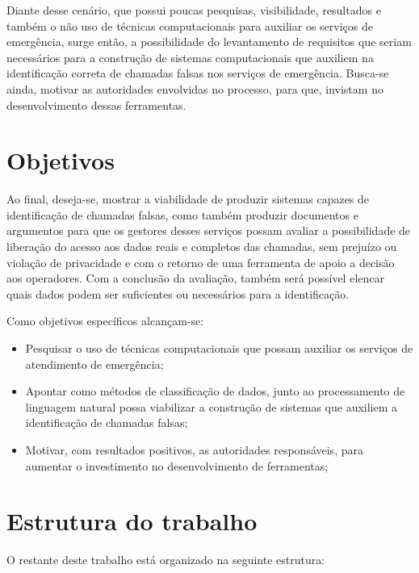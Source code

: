 Diante desse cenário, que possui poucas pesquisas, visibilidade, resultados e também o não uso de técnicas computacionais para auxiliar os serviços de emergência, surge então, a possibilidade do levantamento de requisitos que seriam necessários para a construção de sistemas computacionais que auxiliem na identificação correta de chamadas falsas nos serviços de emergência. Busca-se ainda, motivar as autoridades envolvidas no processo, para que, invistam no desenvolvimento dessas ferramentas.

\section{Objetivos}
Ao final, deseja-se, mostrar a viabilidade de produzir sistemas capazes de identificação de chamadas falsas, como também produzir documentos e argumentos para que os gestores desses serviços possam avaliar a possibilidade de liberação do acesso aos dados reais e completos das chamadas, sem prejuízo ou violação de privacidade e com o retorno de uma ferramenta de apoio a decisão aos operadores. Com a conclusão da avaliação, também será possível elencar quais dados podem ser suficientes ou necessários para a identificação.

Como objetivos específicos alcançam-se:

\begin{itemize}
    \item Pesquisar o uso de técnicas computacionais que possam auxiliar os serviços de atendimento de emergência;
    \item Apontar como métodos de classificação de dados, junto ao processamento de linguagem natural possa viabilizar a construção de sistemas que auxiliem a identificação de chamadas falsas;
    \item Motivar, com resultados positivos, as autoridades responsáveis, para aumentar o investimento no desenvolvimento de ferramentas;
\end{itemize}

\section{Estrutura do trabalho}
O restante deste trabalho está organizado na seguinte estrutura:

